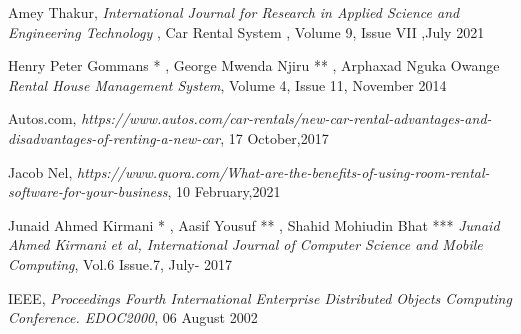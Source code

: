 {}
\begin{thebibliography}{99} %


Amey Thakur,
\textit{International Journal for Research in Applied Science and Engineering Technology },   Car Rental System   ,                            Volume 9, Issue VII ,July 2021

Henry Peter Gommans *
, George Mwenda Njiru **
, Arphaxad Nguka Owange
\textit{Rental House Management System},
Volume 4, Issue 11, November 2014

Autos.com,
\textit{https://www.autos.com/car-rentals/new-car-rental-advantages-and-disadvantages-of-renting-a-new-car},
17 October,2017

Jacob Nel,
\textit{https://www.quora.com/What-are-the-benefits-of-using-room-rental-software-for-your-business},
10 February,2021

Junaid Ahmed Kirmani *
, Aasif Yousuf **
, Shahid Mohiudin Bhat ***
\textit{Junaid Ahmed Kirmani et al, International Journal of Computer Science and Mobile Computing},
Vol.6 Issue.7, July- 2017

IEEE,
\textit{ Proceedings Fourth International Enterprise Distributed Objects Computing Conference. EDOC2000},
06 August 2002
\end{thebibliography}

